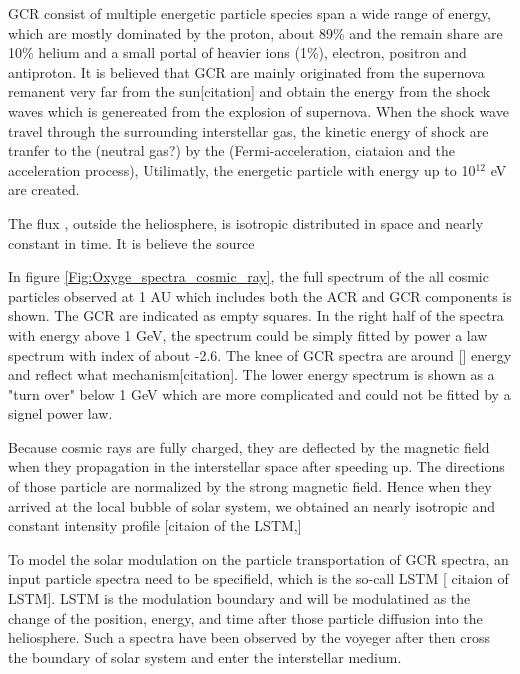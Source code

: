 \acs{GCR} consist of multiple energetic particle species span a wide range of energy, which are mostly dominated by the proton, about 89\%  and the remain share are 10\% helium and a small portal of heavier ions (1\%), electron, positron and antiproton. 
It is believed that \acs{GCR} are mainly originated from the supernova remanent very far from the sun[citation] and obtain the energy from the shock waves which is genereated from the explosion of supernova. When the shock wave travel through the surrounding interstellar gas, the kinetic energy of shock are tranfer to the  (neutral gas?) by the (Fermi-acceleration, ciataion and the acceleration process), Utilimatly, the energetic particle with energy up to 10$^12$ eV are created.

The flux , outside the heliosphere,  is isotropic distributed in space and nearly constant in time.  It is believe the source 

In figure \ref{Fig:Oxyge_spectra_cosmic_ray}, the full spectrum of the all cosmic particles observed at 1 AU which includes both the \ac{ACR} and \ac{GCR} components is shown. The \acs{GCR} are indicated as empty squares. In the right half of the spectra with energy above 1 GeV, the spectrum could be simply fitted by power a law spectrum with index of about -2.6. The knee of GCR spectra are around [] energy and reflect what mechanism[citation]. The lower energy spectrum is shown as a "turn over" below 1 GeV which are more complicated and could not be fitted by a signel power law. 

Because cosmic rays are fully charged, they are deflected by the magnetic field when they propagation in the interstellar space after speeding up. The directions of those particle are normalized by the strong magnetic field. Hence when they arrived at the local bubble of solar system, we obtained an nearly isotropic and constant intensity profile [citaion of the LSTM,]

To model the solar modulation on the particle transportation of GCR spectra, an input particle spectra need to be specifield, which is the so-call LSTM [ citaion of LSTM]. LSTM is the modulation boundary and will be modulatined as the change of the position, energy, and time after those particle diffusion into the heliosphere. Such a spectra have been observed by the voyeger after then cross the boundary of solar system and enter the interstellar medium.


